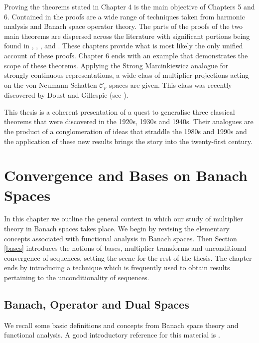 \documentclass[honours,12pt]{unswthesis}
\newcommand{\CC}{\mathcal{C}}
\numberwithin{equation}{section}
\begin{document}
Proving the theorems stated in Chapter 4 is the main objective of 
Chapters 5 and 6. Contained in the proofs are a wide range of techniques
taken from harmonic analysis and Banach space operator theory. 
The parts of the proofs of the two main theorems are dispersed across the 
literature with significant portions being found in
\cite{BBG}, \cite{BG Fourier}, \cite{BG Spectral}, \cite{BGM} and \cite{Bourg}.
These chapters provide what is most likely the only unified account of these
proofs. Chapter 6 ends
with an example that demonstrates the scope of these theorems. Applying the
Strong Marcinkiewicz analogue for strongly continuous representations, a wide
class of multiplier
projections acting on the von Neumann Schatten $\CC_p$ spaces are given. This
class was recently discovered by Doust and Gillespie (see \cite{DG}).

This thesis is a coherent presentation of a quest to generalise three classical
theorems that were discovered in the 1920s, 1930s and 1940s. Their analogues are
the product of a conglomeration of ideas that straddle the 1980s and 1990s and
the application of these new results brings the story into the twenty-first
century.




\chapter{Convergence and Bases on Banach Spaces}



In this chapter we outline the general context in which our study of multiplier
theory in Banach spaces
takes place. We begin by revising the elementary concepts
associated with functional analysis in Banach spaces. Then Section \ref{bases}
introduces the notions of bases, multiplier transforms and unconditional
convergence of sequences, setting the scene for the rest of the thesis. The 
chapter ends by introducing a technique which is frequently used to obtain 
results pertaining to the unconditionality of sequences.


\section{Banach, Operator and Dual Spaces}\label{Banach Spaces}

We recall some basic definitions and concepts from Banach space theory and
functional analysis. A good introductory reference for this material is 
\cite{Con}.
\end{document}
